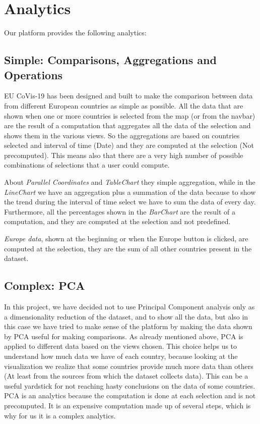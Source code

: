 \documentclass[10pt,conference]{IEEEtran}
\begin{document}
\begin{figure}
\end{figure}

\section{Analytics}
Our platform provides the following analytics:
\subsection{Simple: Comparisons, Aggregations and Operations} 
EU CoVis-19 has been designed and built to make the comparison between data from different European countries as simple as possible. All the data that are shown when one or more countries is selected from the map (or from the navbar) are the result of a computation that aggregates all the data of the selection and shows them in the various views.
So the aggregations are based on countries selected and interval of time (Date) and they are computed at the selection (Not precomputed). This means also that there are a very high number of possible combinations of selections that a user could compute. 

About {\em Parallel Coordinates} and {\em TableChart} they simple aggregation, while in the {\em LineChart} we have an aggregation plus a summation of the data because to show the trend during the interval of time select we have to sum the data of every day. Furthermore, all the percentages shown in the {\em BarChart} are the result of a computation, and they are computed at the selection and not predefined.

{\em Europe data}, shown at the beginning or when the Europe button is clicked, are computed at the selection, they are the sum of all other countries present in the dataset.

\subsection{Complex: PCA}
In this project, we have decided not to use Principal Component analysis only as a dimensionality reduction of the dataset, and to show all the data, but also in this case we have tried to make sense of the platform by making the data shown by PCA useful for making comparisons. As already mentioned above, PCA is applied to different data based on the views chosen. This choice helps us to understand how much data we have of each country, because looking at the visualization we realize that some countries provide much more data than others (At least from the sources from which the dataset collects data). This can be a useful yardstick for not reaching hasty conclusions on the data of some countries. PCA is an analytics because the computation is done at each selection and is not precomputed. It is an expensive computation made up of several steps, which is why for us it is a complex analytics.
\end{document}
